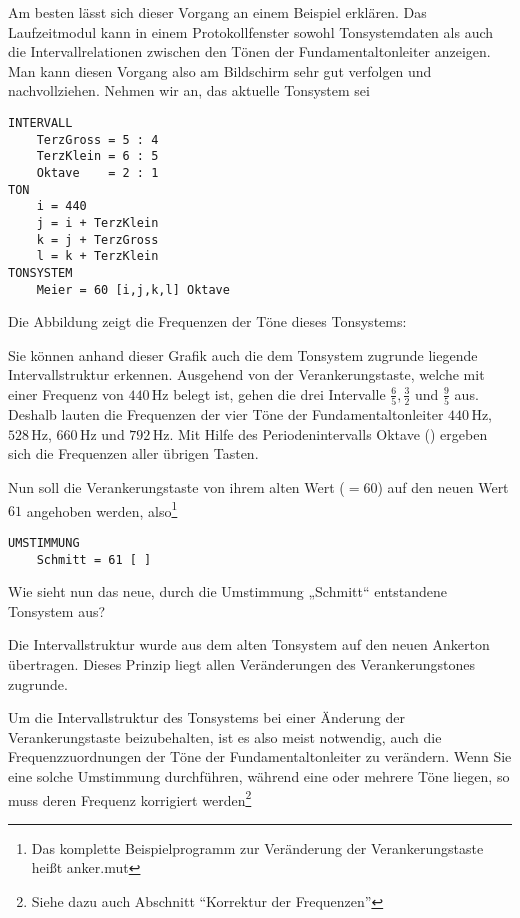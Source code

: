 Am besten lässt sich dieser Vorgang an einem Beispiel erklären. Das
Laufzeitmodul kann in einem Protokollfenster sowohl Tonsystemdaten als
auch die Intervallrelationen zwischen den Tönen der
Fundamentaltonleiter anzeigen.  Man kann diesen Vorgang also am
Bildschirm sehr gut verfolgen und nachvollziehen.  Nehmen wir an, das
aktuelle Tonsystem sei
\label{ANKER}
\begin{verbatim}
INTERVALL
    TerzGross = 5 : 4
    TerzKlein = 6 : 5
    Oktave    = 2 : 1
TON
    i = 440
    j = i + TerzKlein
    k = j + TerzGross
    l = k + TerzKlein
TONSYSTEM
    Meier = 60 [i,j,k,l] Oktave
\end{verbatim}

Die Abbildung zeigt die Frequenzen der Töne dieses Tonsystems:

\begin{center}

\end{center}

Sie können anhand dieser Grafik auch die dem Tonsystem
zugrunde liegende Intervallstruktur erkennen. Ausgehend von der
Verankerungstaste, welche mit einer Frequenz von $440\,\mathrm{Hz}$
belegt ist, gehen die drei Intervalle $\frac{6}{5},\frac{3}{2}$ und
$\frac{9}{5}$ aus. Deshalb lauten die Frequenzen der vier Töne der
Fundamentaltonleiter $440\,\mathrm{Hz}$, $528\,\mathrm{Hz}$,
$660\,\mathrm{Hz}$ und $792\,\mathrm{Hz}$. Mit Hilfe des
Periodenintervalls Oktave () ergeben sich die Frequenzen
aller übrigen Tasten.

Nun soll die Verankerungstaste von ihrem alten Wert ($=60$) auf den
neuen Wert $61$ angehoben werden, also\footnote{Das komplette
Beispielprogramm zur Veränderung der Verankerungstaste heißt
anker.mut}
\begin{verbatim}
UMSTIMMUNG
    Schmitt = 61 [ ]
\end{verbatim}
Wie sieht nun das neue, durch die Umstimmung „Schmitt“ entstandene
Tonsystem aus?

\begin{center}

\end{center}

Die Intervallstruktur wurde aus dem alten Tonsystem auf den neuen
Ankerton übertragen. Dieses Prinzip liegt allen Veränderungen des
Verankerungstones zugrunde.

Um die Intervallstruktur des Tonsystems bei einer Änderung der
Verankerungstaste beizubehalten, ist es also meist notwendig, auch die
Frequenzzuordnungen der Töne der Fundamentaltonleiter zu verändern.
Wenn Sie eine solche Umstimmung durchführen, während eine oder mehrere
Töne liegen, so muss deren Frequenz korrigiert werden\footnote{Siehe
dazu auch Abschnitt "`Korrektur der Frequenzen"'}

